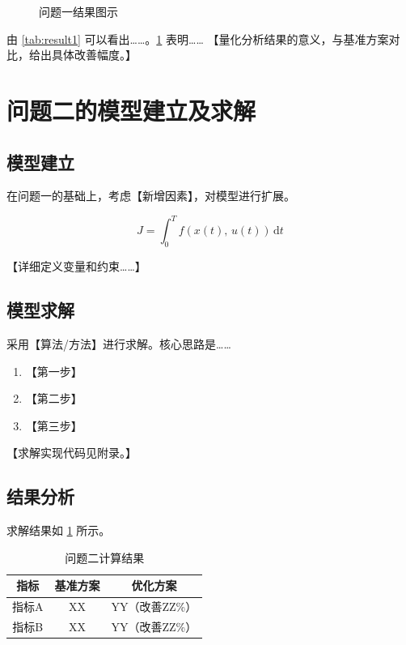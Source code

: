 \documentclass[withoutpreface,bwprint]{cumcmthesis}
\begin{document}
\begin{figure}[H]
    \centering
    \caption{问题一结果图示}
    \label{fig:result1}
\end{figure}

由 \cref{tab:result1} 可以看出……。\cref{fig:result1} 表明……
【量化分析结果的意义，与基准方案对比，给出具体改善幅度。】

\section{问题二的模型建立及求解}

\subsection{模型建立}

在问题一的基础上，考虑【新增因素】，对模型进行扩展。

\begin{equation}
    J = \int_0^T f\!\left(x(t),\, u(t)\right)\,\mathrm{d}t
    \label{eq:obj2}
\end{equation}

【详细定义变量和约束……】

\subsection{模型求解}

采用【算法/方法】进行求解。核心思路是……

\begin{enumerate}
    \item 【第一步】
    \item 【第二步】
    \item 【第三步】
\end{enumerate}

【求解实现代码见附录。】

\subsection{结果分析}

求解结果如 \cref{tab:result2} 所示。

{\renewcommand{\arraystretch}{1.38}
\setlength{\tabcolsep}{6pt}
\begin{longtable}{ccc}
    \caption{问题二计算结果}\label{tab:result2}\\
    \toprule[1.5pt]
    指标  & 基准方案 & 优化方案       \\
    \midrule[1pt]
    \endfirsthead
    \endhead
    \bottomrule[1.5pt]
    \endlastfoot
    指标A & XX   & YY（改善ZZ\%） \\
    指标B & XX   & YY（改善ZZ\%） \\
\end{longtable}}
\end{document}
